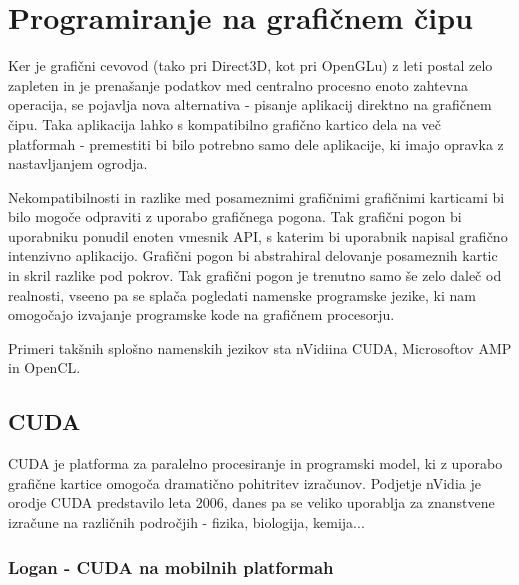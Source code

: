 \chapter{Programiranje na grafičnem čipu}


Ker je grafični cevovod (tako pri Direct3D, kot pri OpenGLu) z leti postal zelo zapleten in je prenašanje podatkov med centralno procesno enoto zahtevna operacija, se pojavlja nova alternativa - pisanje aplikacij direktno na grafičnem čipu. Taka aplikacija lahko s kompatibilno grafično kartico dela na več platformah - premestiti bi bilo potrebno samo dele aplikacije, ki imajo opravka z nastavljanjem ogrodja. 

Nekompatibilnosti in razlike med posameznimi grafičnimi grafičnimi karticami bi bilo mogoče odpraviti z uporabo grafičnega pogona. Tak grafični pogon bi uporabniku ponudil enoten vmesnik API, s katerim bi uporabnik napisal grafično intenzivno aplikacijo. Grafični pogon bi abstrahiral delovanje posameznih kartic in skril razlike pod pokrov. Tak grafični pogon je trenutno samo še zelo daleč od realnosti, vseeno pa se splača pogledati namenske programske jezike, ki nam omogočajo izvajanje programske kode na grafičnem procesorju.

Primeri takšnih splošno namenskih jezikov sta nVidiina CUDA, Microsoftov AMP in OpenCL.

\section{CUDA}
CUDA \cite{cuda} je platforma za paralelno procesiranje in programski model, ki z uporabo grafične kartice omogoča dramatično pohitritev izračunov. Podjetje nVidia je orodje CUDA predstavilo leta 2006, danes pa se veliko uporablja za znanstvene izračune na različnih področjih - fizika, biologija, kemija...

\subsection{Logan - CUDA na mobilnih platformah}


